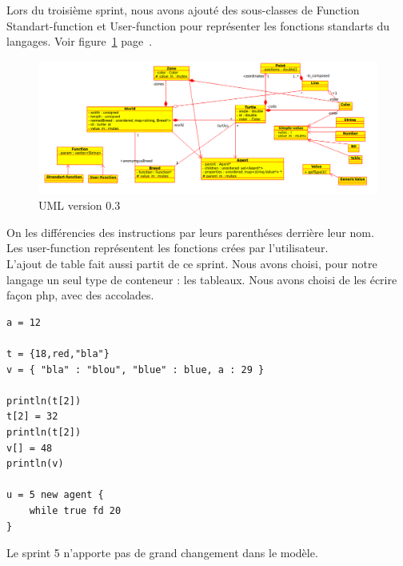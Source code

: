 Lors du troisième sprint, nous avons ajouté des sous-classes de Function Standart-function et User-function pour représenter les fonctions standarts du langages. Voir figure~\ref{v0.3} page~\pageref{v0.3}.
\begin{figure}[h]
\caption{\label{v0.3} UML version 0.3}
\includegraphics[scale=0.4]{doc/report/uml/v03.png}
\end{figure}
On les différencies des instructions par leurs parenthéses derrière leur nom.\\ Les user-function représentent les fonctions crées par l'utilisateur.\\
L'ajout de table fait aussi partit de ce sprint. Nous avons choisi, pour notre langage un seul type de conteneur : les tableaux.
Nous avons choisi de les écrire façon php, avec des accolades.\\
\begin{lstlisting}
a = 12

t = {18,red,"bla"}
v = { "bla" : "blou", "blue" : blue, a : 29 }

println(t[2])
t[2] = 32
println(t[2])
v[] = 48
println(v)

u = 5 new agent {
	while true fd 20
}
\end{lstlisting}
Le sprint 5 n'apporte pas de grand changement dans le modèle.

